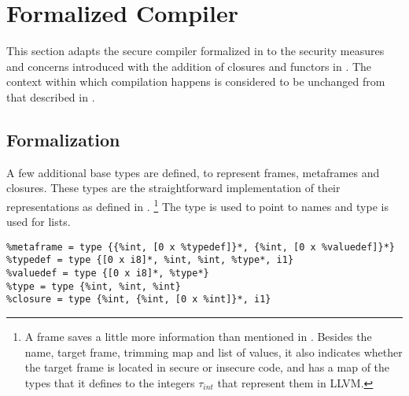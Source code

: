 \section{Formalized Compiler}
\label{sec:formalizedcompiler2}
This section adapts the secure compiler formalized in  to the security measures and concerns introduced with the addition of closures and functors in .
The context within which compilation happens is considered to be unchanged from that described in .

\subsection{Formalization}
A few additional base types are defined, to represent frames, metaframes and closures. These types are the straightforward implementation of their representations as defined in . 
\footnote{A frame saves a little more information than mentioned in . Besides the name, target frame, trimming map and list of values, it also indicates whether the target frame is located in secure or insecure code, and has a map of the types that it defines to the integers $\tau_{int}$ that represent them in LLVM.}
The type \lsttext{[0 x i8]*} is used to point to names and type  is used for lists.
\begin{lstlisting}[language={[x86masm]Assembler}]
%frame = type {[0 x i8]*, %frame*, i1, {%int, [0 x %int]}*, {%int, [0 x %int (%frame*, i8*)*]}*, {%int, [0 x %int]}*, %metaframe*}
%metaframe = type {{%int, [0 x %typedef]}*, {%int, [0 x %valuedef]}*}
%typedef = type {[0 x i8]*, %int, %int, %type*, i1}
%valuedef = type {[0 x i8]*, %type*}
%type = type {%int, %int, %int}
%closure = type {%int, {%int, [0 x %int]}*, i1}
\end{lstlisting}
